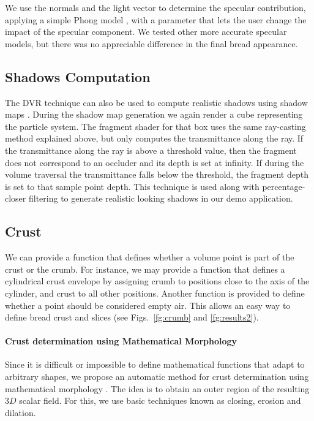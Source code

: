 We use the normals and the light vector to determine the specular contribution, applying a simple Phong model \cite{Phong1973}, with a parameter that lets the user change the impact of the specular component.
We tested other more accurate specular models, but there was no appreciable difference in the final bread appearance.

\subsection*{Shadows Computation}

The DVR technique can also be used to compute realistic shadows using shadow maps \cite{Williams1978}.
During the shadow map generation we again render a cube representing the particle system.
The fragment shader for that box uses the same ray-casting method explained above, but only computes the transmittance along the ray. 
If the transmittance along the ray is above a threshold value, then the fragment does not correspond to an occluder and its depth is set at infinity. 
If during the volume traversal the transmittance falls below the threshold, the fragment depth is set to that sample point depth.
This technique is used along with percentage-closer filtering to generate realistic looking shadows in our demo application.

\subsection*{Crust}
We can provide a function that defines whether a volume point is part of the crust or the crumb. For instance, we may provide a function that defines a cylindrical crust envelope by assigning crumb to positions close to the axis of the cylinder, and crust to all other positions. Another function is provided to define whether a point should be considered empty air.
This allows an easy way to define bread crust and slices (see Figs.~\ref{fg:crumb} and \ref{fg:results2}).

\paragraph{Crust determination using Mathematical Morphology}
Since it is difficult or impossible to define mathematical functions that adapt to arbitrary shapes, we propose an automatic method for crust determination using mathematical morphology \cite{Gonzalez2001}.
The idea is to obtain an outer region of the resulting $3D$ scalar field. 
For this, we use basic techniques known as closing, erosion and dilation.

